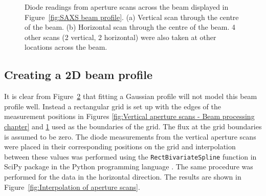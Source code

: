 \begin{figure}
\begin{subfigure}[b]{0.9\textwidth}
            \caption{}
            \label{fig:Horizontal aperture scans - Beam processing chapter}
    \end{subfigure}
    \caption{Diode readings from aperture scans across the beam displayed in Figure~\ref{fig:SAXS beam profile}. (a) Vertical scan through the centre of the beam. (b) Horizontal scan through the centre of the beam. 4 other scans (2 vertical, 2 horizontal) were also taken at other locations across the beam.}
    \label{fig:Aperture scans - Beam processing chapter}
\end{figure}

\subsection{Creating a 2D beam profile}
\label{sub:Creating a 2D beam profile}
It is clear from Figure~\ref{fig:Aperture scans - Beam processing chapter} that fitting a Gaussian profile will not model this beam profile well.
Instead a rectangular grid is set up with the edges of the measurement positions in Figures \ref{fig:Vertical aperture scans - Beam processing chapter} and \ref{fig:Horizontal aperture scans - Beam processing chapter} used as the boundaries of the grid.
The flux at the grid boundaries is assumed to be zero.
The diode measurements from the vertical aperture scans were placed in their corresponding positions on the grid and interpolation between these values was performed using the \verb+RectBivariateSpline+ function in SciPy package in the Python programming language \cite{jones2014scipy}.
The same procedure was performed for the data in the horizontal direction.
The results are shown in Figure~\ref{fig:Interpolation of aperture scans}.
